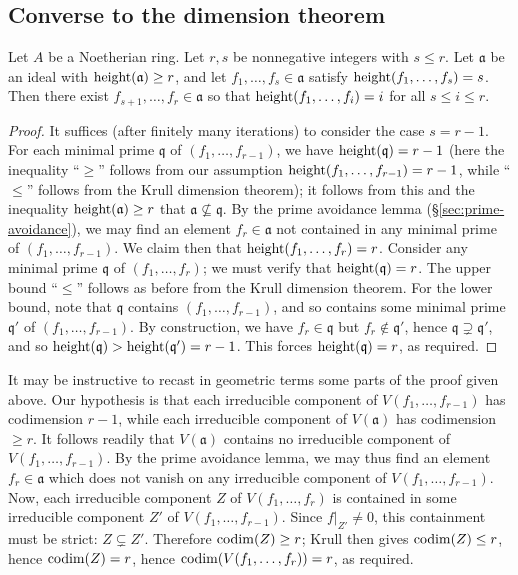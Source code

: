 \documentclass[10pt]{article}
\begin{document}
\subsection{Converse to the dimension theorem}
\label{sec:org858899e}

\begin{theorem}\label{thm:conv-to-krull-1}
Let $A$ be a Noetherian ring.
Let $r,s$ be nonnegative integers
with $s \leq r$.
Let $\mathfrak{a}$ be an ideal with $\operatorname{height}(\mathfrak{a})
\geq r$,
and let
$f_1,\dotsc,f_s \in \mathfrak{a}$
satisfy
$\operatorname{height}(f_1,\dotsc,f_s) = s$.
Then there exist $f_{s+1},\dotsc,f_r \in \mathfrak{a}$
so that
$\operatorname{height}(f_1,\dotsc,f_i) = i$
for all $s \leq i \leq r$.
\end{theorem}
\begin{proof}
  It suffices (after finitely many iterations) to consider the
  case $s = r-1$.  For each minimal prime $\mathfrak{q}$ of
  $(f_1,\dotsc,f_{r-1})$, we have $\operatorname{height}(\mathfrak{q}) = r-1$
  (here the inequality ``$\geq$'' follows from our assumption
  $\operatorname{height}(f_1,\dotsc,f_{r-1}) = r-1$, while ``$\leq$'' follows
  from the Krull dimension theorem);
  it follows from this
  and the inequality
  $\operatorname{height}(\mathfrak{a}) \geq r$
  that $\mathfrak{a} \not\subseteq \mathfrak{q}$.
  By the prime avoidance lemma (\S\ref{sec:prime-avoidance}),
  we may find an element $f_r \in \mathfrak{a}$ not contained in
  any minimal prime
  of $(f_1,\dotsc,f_{r-1})$.
  We claim then that $\operatorname{height}(f_1,\dotsc,f_r) = r$.
  Consider any minimal prime $\mathfrak{q}$ of
  $(f_1,\dotsc,f_r)$;
  we must verify that $\operatorname{height}(\mathfrak{q}) = r$.
  The upper bound ``$\leq$'' follows
  as before from the Krull dimension theorem.
  For the lower bound,
  note that $\mathfrak{q}$ contains $(f_1,\dotsc,f_{r-1})$,
  and so contains some minimal prime $\mathfrak{q} '$ of
  $(f_1,\dotsc,f_{r-1})$.
  By construction, we have $f_r \in \mathfrak{q}$
  but $f_r \notin \mathfrak{q} '$,
  hence $\mathfrak{q} \supsetneq \mathfrak{q} '$,
  and so $\operatorname{height}(\mathfrak{q}) > \operatorname{height}(\mathfrak{q} ')= r-1$.
  This forces $\operatorname{height}(\mathfrak{q}) = r$, as required.
\end{proof}
\begin{remark}
  It may be instructive
  to recast in geometric terms
  some parts of the proof given above.
  Our hypothesis is that each irreducible
  component of $V(f_1,\dotsc,f_{r-1})$ has codimension $r-1$,
  while each irreducible component of $V(\mathfrak{a})$ has
  codimension
  $\geq r$.
  It follows readily that $V(\mathfrak{a})$ contains
  no irreducible component of $V(f_1,\dotsc,f_{r-1})$.
  By the prime avoidance lemma,
  we may thus find an element $f_r \in \mathfrak{a}$
  which does not vanish on any irreducible component
  of $V(f_1,\dotsc,f_{r-1})$.
  Now, each irreducible component $Z$ of $V(f_1,\dotsc,f_r)$
  is contained in some irreducible component $Z'$ of
  $V(f_1,\dotsc,f_{r-1})$.
  Since $f|_{Z'} \neq 0$,
  this containment must be strict: $Z \subsetneq Z'$.
  Therefore $\operatorname{codim}(Z) \geq r$;
  Krull then gives $\operatorname{codim}(Z) \leq r$,
  hence $\operatorname{codim}(Z) = r$,
  hence $\operatorname{codim}(V(f_1,\dotsc,f_r)) = r$, as required.
\end{remark}
\end{document}
